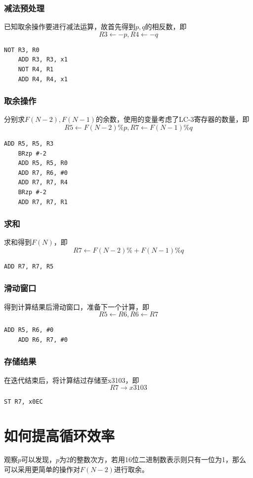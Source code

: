 \documentclass[12pt, a4paper, oneside]{ctexart}
\begin{document}
\subsubsection*{减法预处理}
已知取余操作要进行减法运算，故首先得到$p,q$的相反数，即$$R3 \leftarrow -p, R4 \leftarrow -q$$
\begin{lstlisting}[name = code, firstnumber = last]
    NOT R3, R0
    ADD R3, R3, x1
    NOT R4, R1
    ADD R4, R4, x1
\end{lstlisting}
\subsubsection*{取余操作}
分别求$F(N-2),F(N-1)$的余数，使用的变量考虑了LC-3寄存器的数量，即
$$R5 \leftarrow F(N-2) \% p, R7 \leftarrow F(N-1) \% q$$
\begin{lstlisting}[name = code, firstnumber = last]
    ADD R5, R5, R3 
    BRzp #-2
    ADD R5, R5, R0
    ADD R7, R6, #0
    ADD R7, R7, R4
    BRzp #-2
    ADD R7, R7, R1
\end{lstlisting}
\subsubsection*{求和}
求和得到$F(N)$，即
$$R7 \leftarrow F(N-2) \% + F(N-1) \% q$$
\begin{lstlisting}[name = code, firstnumber = last]
    ADD R7, R7, R5
\end{lstlisting}
\subsubsection*{滑动窗口}
得到计算结果后滑动窗口，准备下一个计算，即
$$R5 \leftarrow R6, R6 \leftarrow R7$$
\begin{lstlisting}[name = code, firstnumber = last]
    ADD R5, R6, #0
    ADD R6, R7, #0
\end{lstlisting}
\subsubsection*{存储结果}
在迭代结束后，将计算结过存储至x3103，即
$$R7 \rightarrow x3103$$
\begin{lstlisting}[name = code, firstnumber = last]
    ST R7, x0EC
\end{lstlisting}

\section*{如何提高循环效率}
观察$p$可以发现，$p$为2的整数次方，若用16位二进制数表示则只有一位为1，那么可以采用更简单的操作对$F(N-2)$进行取余。
\end{document}
